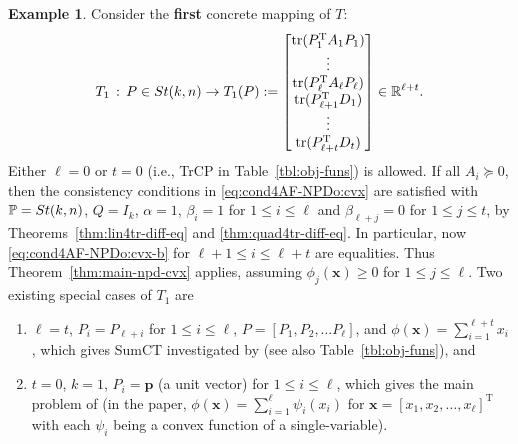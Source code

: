 \documentclass[11pt]{article}
\def\bp{\pmb{p}}
\def\bx{\pmb{x}}
\def\bbP{\mathbb{P}}
\def\bbR{\mathbb{R}}
\newcommand\STM[2]{{\rm St}(#1,#2)}
\DeclareMathOperator{\tr}{tr}
\DeclareMathOperator{\T}{T}
\theoremstyle{definition}
\newtheorem{example}{Example}[section]
\numberwithin{equation}{section}
\begin{document}
\begin{example}\label{eg:T1}
Consider
the {\bf first} concrete mapping of $T$:
\begin{equation}\label{eq:T-tr}
T_1\,:\, P\in\STM{k}{n} \to T_1(P):=\begin{bmatrix}
                                        \tr(P_1^{\T}A_1P_1) \\
                                        \vdots \\
                                        \tr(P_{\ell}^{\T}A_{\ell}P_{\ell}) \\
                                        \tr(P_{\ell+1}^{\T}D_1) \\
                                        \vdots \\
                                        \tr(P_{\ell+t}^{\T}D_t) \\
                                      \end{bmatrix} \in\bbR^{\ell+t}.
\end{equation}
Either $\ell=0$ or $t=0$ (i.e., TrCP in Table~\ref{tbl:obj-funs}) is allowed. If all $A_i\succeq 0$, then
the consistency conditions in \eqref{eq:cond4AF-NPDo:cvx} are satisfied with $\bbP=\STM{k}{n}$, $Q=I_k$,
$\alpha=1$, $\beta_i=1$ for $1\le i\le\ell$ and $\beta_{\ell+j}=0$ for $1\le j\le t$, by
Theorems~\ref{thm:lin4tr-diff-eq} and \ref{thm:quad4tr-diff-eq}.
In particular, now \eqref{eq:cond4AF-NPDo:cvx-b} for $\ell+1\le i\le\ell+t$ are equalities.
Thus Theorem~\ref{thm:main-npd-cvx} applies, assuming $\phi_j(\bx)\ge 0$ for $1\le j\le\ell$.
Two existing special cases of $T_1$
are
\begin{enumerate}[(1)]
  \item $\ell=t$, $P_i=P_{\ell+i}$ for $1\le i\le\ell$, $P=[P_1,P_2,\ldots P_{\ell}]$, and $\phi(\bx)=\sum_{i=1}^{\ell+t}x_i$, which
gives SumCT investigated by \cite{wazl:2022a} (see also Table~\ref{tbl:obj-funs}), and
  \item $t=0$, $k=1$, $P_i=\bp$ (a unit vector) for $1\le i\le\ell$, which gives the main problem of \cite{balu:2024}
  (in the paper, $\phi(\bx)=\sum_{i=1}^{\ell}\psi_i(x_i)$
for $\bx=[x_1,x_2,\ldots,x_{\ell}]^{\T}$ with each $\psi_i$ being a convex function of a single-variable).
\end{enumerate}


\end{example}
\end{document}
